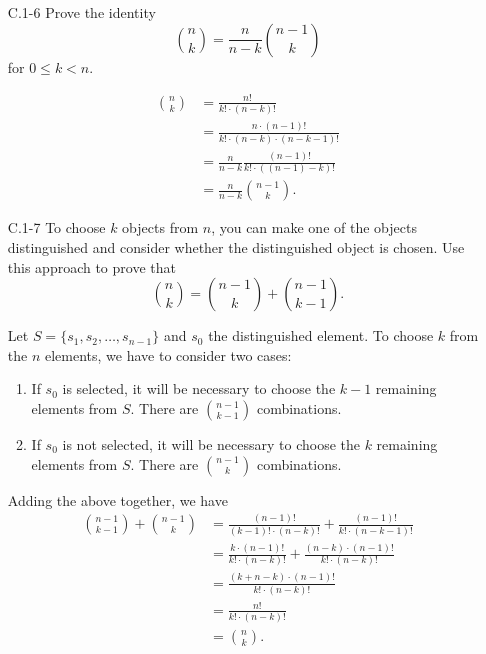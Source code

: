 \begin{enumerate}
\item[C.1{-}6] {Prove the identity
\[
  \binom{n}{k} = \frac{n}{n - k} \binom{n - 1}{k}
\]
for $0 \le k < n$.
}

\begin{framed}
\begin{equation*}
\begin{aligned}
  \binom{n}{k} &= \frac{n!}{k! \cdot (n - k)!}\\
               &= \frac{n \cdot (n - 1)!}{k! \cdot (n - k) \cdot (n - k - 1)!}\\
               &= \frac{n}{n - k} \frac{(n - 1)!}{k! \cdot ((n - 1) - k)!}\\
               &= \frac{n}{n - k} \binom{n - 1}{k}.
\end{aligned}
\end{equation*}
\end{framed}

\item[C.1{-}7] {To choose $k$ objects from $n$, you can make one of the objects
distinguished and consider whether the distinguished object is chosen. Use this
approach to prove that
\[
  \binom{n}{k} = \binom{n - 1}{k} + \binom{n - 1}{k - 1}.
\]
}

\begin{framed}
Let $S = \{s_1, s_2, \dots, s_{n - 1}\}$ and $s_0$ the
distinguished element. To choose $k$ from the $n$ elements, we have to consider
two cases:
\begin{enumerate}
  \item If $s_0$ is selected, it will be necessary to choose the $k - 1$
    remaining elements from $S$. There are $\binom{n - 1}{k - 1}$ combinations.
  \item If $s_0$ is not selected, it will be necessary to choose the $k$
    remaining elements from $S$. There are $\binom{n - 1}{k}$ combinations.
\end{enumerate}
Adding the above together, we have
\begin{equation*}
\begin{aligned}
  \binom{n - 1}{k - 1} + \binom{n - 1}{k}
  &= \frac{(n - 1)!}{(k - 1)! \cdot (n - k)!} + \frac{(n - 1)!}{k! \cdot (n - k - 1)!}\\
  &= \frac{k \cdot (n - 1)!}{k! \cdot (n - k)!} + \frac{(n - k) \cdot (n - 1)!}{k! \cdot (n - k)!}\\
  &= \frac{(k + n - k) \cdot (n - 1)!}{k! \cdot (n - k)!}\\
  &= \frac{n!}{k! \cdot (n - k)!}\\
  &= \binom{n}{k}.
\end{aligned}
\end{equation*}
\end{framed}


\end{enumerate}
